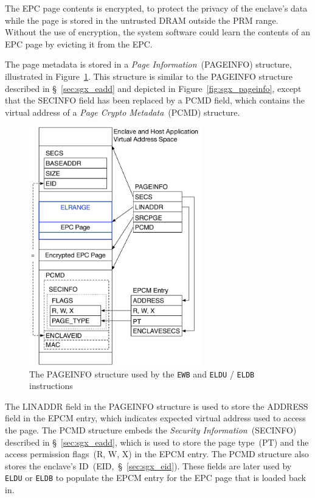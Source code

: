 The EPC page contents is encrypted, to protect the privacy of the enclave's
data while the page is stored in the untrusted DRAM outside the PRM range.
Without the use of encryption, the system software could learn the contents of
an EPC page by evicting it from the EPC.


The page metadata is stored in a \textit{Page Information}~(PAGEINFO)
structure, illustrated in Figure~\ref{fig:sgx_ewb_pageinfo}. This structure is
similar to the PAGEINFO structure described in \S~\ref{sec:sgx_eadd} and
depicted in Figure~\ref{fig:sgx_pageinfo}, except that the SECINFO field has
been replaced by a PCMD field, which contains the virtual address of a
\textit{Page Crypto Metadata}~(PCMD) structure.

\begin{figure}[hbt]
  \centering
  \includegraphics[width=75mm]{figures/sgx_ewb_pageinfo.pdf}
  \caption{
    The PAGEINFO structure used by the \texttt{EWB} and \texttt{ELDU} /
    \texttt{ELDB} instructions
  }
  \label{fig:sgx_ewb_pageinfo}
\end{figure}

The LINADDR field in the PAGEINFO structure is used to store the ADDRESS field
in the EPCM entry, which indicates expected virtual address used to access the
page. The PCMD structure embeds the \textit{Security Information}~(SECINFO)
described in \S~\ref{sec:sgx_eadd}, which is used to store the page type~(PT)
and the access permission flags~(R, W, X) in the EPCM entry. The PCMD structure
also stores the enclave's ID~(EID,~\S~\ref{sec:sgx_eid}). These fields are
later used by \texttt{ELDU} or \texttt{ELDB} to populate the EPCM entry for the
EPC page that is loaded back in.

